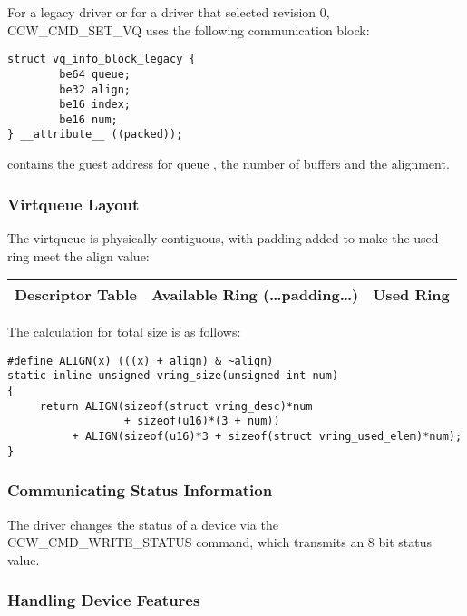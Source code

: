 For a legacy driver or for a driver that selected revision 0,
CCW_CMD_SET_VQ uses the following communication block:

\begin{lstlisting}
struct vq_info_block_legacy {
        be64 queue;
        be32 align;
        be16 index;
        be16 num;
} __attribute__ ((packed));
\end{lstlisting}

 contains the guest address for queue ,  the number of buffers
and  the alignment.

\subsubsection{Virtqueue Layout}\label{sec:Virtio Transport Options / Virtio over channel I/O / Device Initialization / Virtqueue Layout}

The virtqueue is physically contiguous, with padding added to make the
used ring meet the align value:

\begin{tabular}{|l|l|l|}
\hline
Descriptor Table & Available Ring (\ldots padding\ldots) & Used Ring \\
\hline
\end{tabular}

The calculation for total size is as follows:

\begin{lstlisting}
#define ALIGN(x) (((x) + align) & ~align)
static inline unsigned vring_size(unsigned int num)
{
     return ALIGN(sizeof(struct vring_desc)*num
                  + sizeof(u16)*(3 + num))
          + ALIGN(sizeof(u16)*3 + sizeof(struct vring_used_elem)*num);
}
\end{lstlisting}

\subsubsection{Communicating Status Information}\label{sec:Virtio Transport Options / Virtio over channel I/O / Device Initialization / Communicating Status Information}

The driver changes the status of a device via the
CCW_CMD_WRITE_STATUS command, which transmits an 8 bit status
value.

\subsubsection{Handling Device Features}\label{sec:Virtio Transport Options / Virtio over channel I/O / Device Initialization / Handling Device Features}

